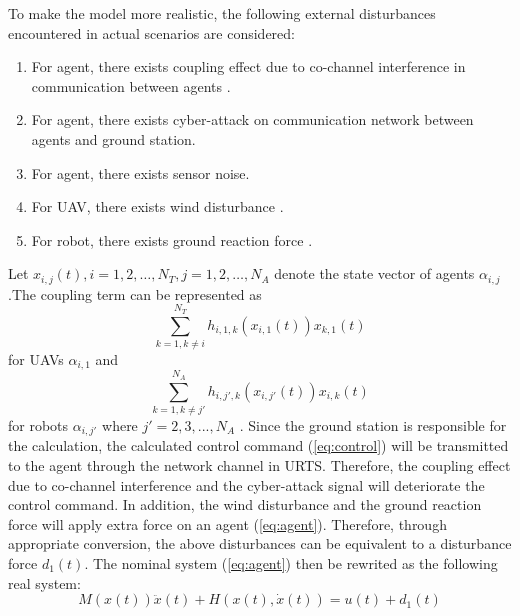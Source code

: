 \documentclass{ieeeaccess}
\begin{document}
To make the model more realistic, the following external disturbances encountered in actual scenarios are considered:
\begin{enumerate}
    \item For agent, there exists coupling effect due to co-channel interference in communication between agents \cite{9834947}.
    \item For agent, there exists cyber-attack on communication network between agents and ground station.
    \item For agent, there exists sensor noise.
    \item For UAV, there exists wind disturbance \cite{9075385}.
    \item For robot, there exists ground reaction force \cite{chen2013human}. 
\end{enumerate}
Let $x_{i,j}(t), i=1,2,\dots,N_T, j=1,2,\dots,N_A$ denote the state vector of agents $\alpha_{i,j}$.The coupling term can be represented as \begin{equation} \label{eq:UAV couple}
    \sum_{k = 1, k \neq i}^{N_T}h_{i, 1, k}(x_{i, 1}(t))x_{k, 1}(t)
\end{equation} for UAVs $\alpha_{i, 1}$ and \begin{equation} \label{eq:robot couple}
    \sum_{k = 1, k \neq j'}^{N_A}h_{i, j', k}(x_{i, j'}(t))x_{i, k}(t)
\end{equation} for robots $\alpha_{i, j'}$ where $j'=2,3,...,N_A$ \cite{9834947}. Since the ground station is responsible for the calculation, the calculated control command (\ref{eq:control}) will be transmitted to the agent through the network channel in URTS. Therefore, the coupling effect due to co-channel interference and the cyber-attack signal will deteriorate the control command. In addition, the wind disturbance and the ground reaction force will apply extra force on an agent (\ref{eq:agent}). Therefore, through appropriate conversion, the above disturbances can be equivalent to a disturbance force $d_1(t)$. The nominal system (\ref{eq:agent}) then be rewrited as the following real system:
\begin{equation} \label{eq:agent d1} 
    M(x(t))\ddot{x}(t) + H(x(t),\dot{x}(t)) = u(t) + d_1(t)
\end{equation}
\end{document}
